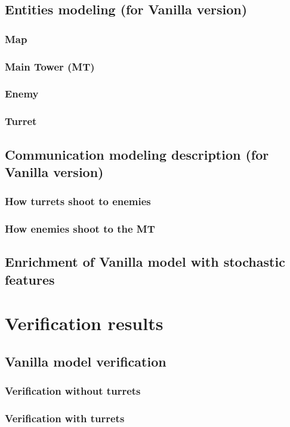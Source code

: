 \documentclass[
10pt, %
a4paper, %
oneside, %
headinclude,footinclude, %
BCOR5mm, %
]{scrartcl}
\begin{document}
		\subsection{Entities modeling (for Vanilla version)}
			\subsubsection{Map}
			\subsubsection{Main Tower (MT)}
			\subsubsection{Enemy}
			\subsubsection{Turret}
		\subsection{Communication modeling description (for Vanilla version)}
			\subsubsection{How turrets shoot to enemies}
			\subsubsection{How enemies shoot to the MT}
		\subsection{Enrichment of Vanilla model with stochastic features}
	\section{Verification results}
		\subsection{Vanilla model verification}
			\subsubsection{Verification without turrets}
			\subsubsection{Verification with turrets}
\end{document}
